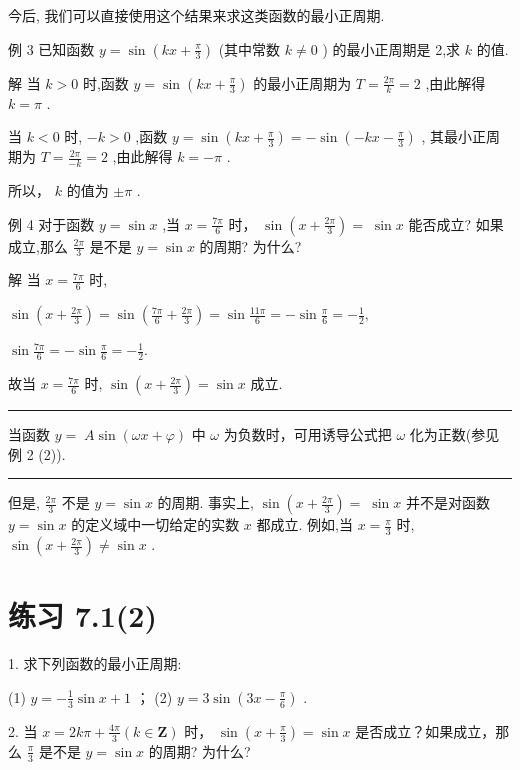 \documentclass[10pt]{article}
\newcommand{\HRule}{\begin{center}\rule{0.9\linewidth}{0.2mm}\end{center}}
\begin{document}
今后, 我们可以直接使用这个结果来求这类函数的最小正周期.

例 3 已知函数 \(y = \sin \left( {{kx} + \frac{\pi }{3}}\right)\) (其中常数 \(k \neq  0\) ) 的最小正周期是 2,求 \(k\) 的值.

解 当 \(k > 0\) 时,函数 \(y = \sin \left( {{kx} + \frac{\pi }{3}}\right)\) 的最小正周期为 \(T = \frac{2\pi }{k} = 2\) ,由此解得 \(k = \pi\) .

当 \(k < 0\) 时, \(- k > 0\) ,函数 \(y = \sin \left( {{kx} + \frac{\pi }{3}}\right)  =  - \sin \left( {-{kx} - \frac{\pi }{3}}\right)\) , 其最小正周期为 \(T = \frac{2\pi }{-k} = 2\) ,由此解得 \(k =  - \pi\) .

所以， \(k\) 的值为 \(\pm  \pi\) .

例 4 对于函数 \(y = \sin x\) ,当 \(x = \frac{7\pi }{6}\) 时， \(\sin \left( {x + \frac{2\pi }{3}}\right)  = \; \sin x\) 能否成立? 如果成立,那么 \(\frac{2\pi }{3}\) 是不是 \(y = \sin x\) 的周期? 为什么?

解 当 \(x = \frac{7\pi }{6}\) 时,

\(\sin \left( {x + \frac{2\pi }{3}}\right)  = \sin \left( {\frac{7\pi }{6} + \frac{2\pi }{3}}\right)  = \sin \frac{11\pi }{6} =  - \sin \frac{\pi }{6} =  - \frac{1}{2},\)

\(\sin \frac{7\pi }{6} =  - \sin \frac{\pi }{6} =  - \frac{1}{2}.\)

故当 \(x = \frac{7\pi }{6}\) 时, \(\sin \left( {x + \frac{2\pi }{3}}\right)  = \sin x\) 成立.

\HRule

当函数 \(y = \; A\sin \left( {{\omega x} + \varphi }\right)\) 中 \(\omega\) 为负数时，可用诱导公式把 \(\omega\) 化为正数(参见例 2 (2)).

\HRule

但是, \(\frac{2\pi }{3}\) 不是 \(y = \sin x\) 的周期. 事实上, \(\sin \left( {x + \frac{2\pi }{3}}\right)  = \; \sin x\) 并不是对函数 \(y = \sin x\) 的定义域中一切给定的实数 \(x\) 都成立. 例如,当 \(x = \frac{\pi }{3}\) 时, \(\sin \left( {x + \frac{2\pi }{3}}\right)  \neq  \sin x\) .

\section*{练习 7.1(2)}

1. 求下列函数的最小正周期:

(1) \(y =  - \frac{1}{3}\sin x + 1\) ； (2) \(y = 3\sin \left( {{3x} - \frac{\pi }{6}}\right)\) .

2. 当 \(x = {2k\pi } + \frac{4\pi }{3}\left( {k \in  \mathbf{Z}}\right)\) 时， \(\sin \left( {x + \frac{\pi }{3}}\right)  = \sin x\) 是否成立？如果成立，那么 \(\frac{\pi }{3}\) 是不是 \(y = \sin x\) 的周期? 为什么?
\end{document}
